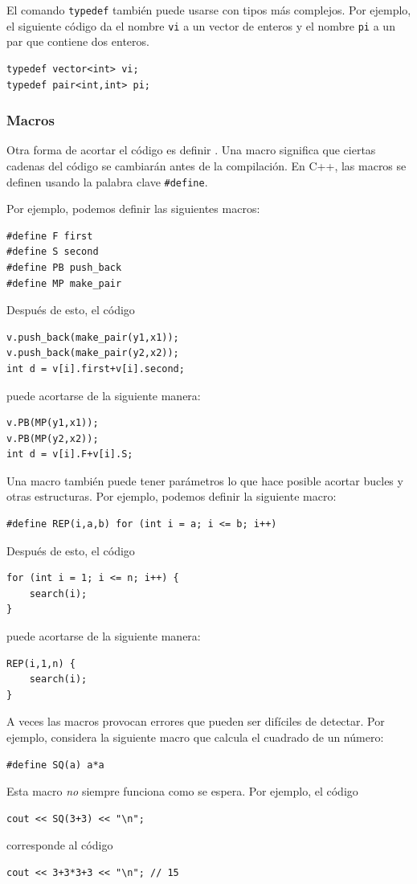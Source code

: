 El comando \texttt{typedef}
también puede usarse con tipos más complejos.
Por ejemplo, el siguiente código da
el nombre \texttt{vi} a un vector de enteros
y el nombre \texttt{pi} a un par
que contiene dos enteros.
\begin{lstlisting}
typedef vector<int> vi;
typedef pair<int,int> pi;
\end{lstlisting}

\subsubsection{Macros}
Otra forma de acortar el código es definir
.
Una macro significa que ciertas cadenas del
código se cambiarán antes de la compilación.
En C++, las macros se definen usando la
palabra clave \texttt{\#define}.

Por ejemplo, podemos definir las siguientes macros:
\begin{lstlisting}
#define F first
#define S second
#define PB push_back
#define MP make_pair
\end{lstlisting}
Después de esto, el código
\begin{lstlisting}
v.push_back(make_pair(y1,x1));
v.push_back(make_pair(y2,x2));
int d = v[i].first+v[i].second;
\end{lstlisting}
puede acortarse de la siguiente manera:
\begin{lstlisting}
v.PB(MP(y1,x1));
v.PB(MP(y2,x2));
int d = v[i].F+v[i].S;
\end{lstlisting}

Una macro también puede tener parámetros
lo que hace posible acortar bucles y otras
estructuras.
Por ejemplo, podemos definir la siguiente macro:
\begin{lstlisting}
#define REP(i,a,b) for (int i = a; i <= b; i++)
\end{lstlisting}
Después de esto, el código
\begin{lstlisting}
for (int i = 1; i <= n; i++) {
    search(i);
}
\end{lstlisting}
puede acortarse de la siguiente manera:
\begin{lstlisting}
REP(i,1,n) {
    search(i);
}
\end{lstlisting}

A veces las macros provocan errores que pueden ser difíciles
de detectar. Por ejemplo, considera la siguiente macro
que calcula el cuadrado de un número:
\begin{lstlisting}
#define SQ(a) a*a
\end{lstlisting}
Esta macro \emph{no} siempre funciona como se espera.
Por ejemplo, el código
\begin{lstlisting}
cout << SQ(3+3) << "\n";
\end{lstlisting}
corresponde al código
\begin{lstlisting}
cout << 3+3*3+3 << "\n"; // 15
\end{lstlisting}

